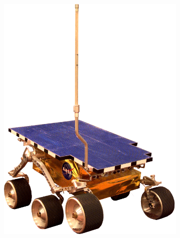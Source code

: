 \begin{figure}[h]
\captionsetup[subfigure]{justification=centering}
\vspace{-2ex}
	\centering
    \setlength{\subfigureWidth}{0.45\textwidth}
    \setlength{\graphicsHeight}{35mm}
    \hypersetup{hidelinks=true}%
	\begin{subfigure}[t]{\subfigureWidth}
        \centering
        \includegraphics[height=\graphicsHeight]{sections/state-of-the-art/past-missions/images/rover-sojourner.png}
        \label{fig:sub:past-mission-rover-sojourner}
	\end{subfigure}\\[0.8ex]
	\begin{subfigure}[t]{\subfigureWidth}
        \centering

\end{subfigure}
\end{figure}
